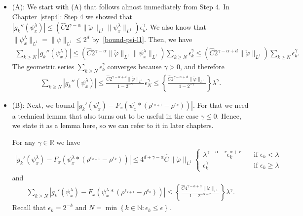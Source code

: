 \begin{itemize}
    \item (A): We start with (A) that follows almost immediately from Step 4. In Chapter~\ref{step4}: Step 4 we showed that \(|g_k''(\psi^{\lambda}_x)| 
    {\leq}  \left(\hat C  2^{\gamma - \alpha} \lVert \check \varphi \rVert_{L^1} \lVert \psi^{\lambda}_x \rVert_{L^1}\right) \epsilon_k^\gamma\). We also know that \(\lVert \psi^\lambda_x \rVert_{L^1} = \lVert \psi \rVert_{L^1} \leq 2^d\) by~\eqref{bound-psi-l1}. Then, we have
    \begin{align*}
        \sum_{k \geq N} |g_k''(\psi^{\lambda}_x)|  \leq 
        \left(\hat C  2^{\gamma - \alpha} \lVert \check \varphi \rVert_{L^1} \lVert \psi^{\lambda}_x \rVert_{L^1}\right) \sum_{k \geq N}  \epsilon_k^\gamma 
        \leq \left(\hat C  2^{\gamma - \alpha + d} \lVert \check \varphi \rVert_{L^1} \right) \sum_{k \geq N}  \epsilon_k^\gamma.
    \end{align*}
    The geometric series \(\sum\limits_{k \geq N}  \epsilon_k^\gamma\) converges because \(\gamma > 0\), and therefore
    \begin{align*}
        \sum_{k \geq N} |g_k''(\psi^{\lambda}_x)| \leq 
        \frac{\hat C  2^{\gamma - \alpha + d} \lVert \check \varphi \rVert_{L^1}}{1-2^{-\gamma}} \epsilon_N^{\gamma}
        \leq
        \left\{\frac{\hat C  2^{\gamma - \alpha + d} \lVert \check \varphi \rVert_{L^1}}{1-2^{-\gamma}}\right\} \lambda^{\gamma}.
    \end{align*}
 
    \item (B): Next, we bound \(|g_k'(\psi^\epsilon_x) - F_x(\psi^\epsilon_x * (\rho^{\epsilon_{k+1}} - \rho^{\epsilon_k}))|\). For that we need a technical lemma that also turns out to be useful in the case \(\gamma \leq 0\). Hence, we state it as a lemma here, so we can refer to it in later chapters.
    

    \begin{lemma}\label{technical-lemma-2}
        For any \(\gamma \in \mathbb{R}\) we have 
        \begin{align*}
            |g_k'(\psi^\lambda_x) - F_x(\psi^\lambda_x * (\rho^{\epsilon_{k+1}} - \rho^{\epsilon_k}))| \leq 4^{d + \gamma - \alpha} \hat C \lVert \check \varphi \rVert_{L^1} \begin{cases}
                \lambda^{\gamma - \alpha - r} \epsilon_k^{\alpha + r}  \quad &\text{if \(\epsilon_k < \lambda\) }\\
                \epsilon_k^\gamma & \text{if \(\epsilon_k \geq \lambda\) }
            \end{cases}
        \end{align*}
        and 
        \begin{align*}
            \sum_{k \geq N} |g_k'(\psi^\lambda_x) - F_x(\psi^\lambda_x * (\rho^{\epsilon_{k+1}} - \rho^{\epsilon_k}))|
            \leq
            \left \{ \frac{\hat C 4^{\gamma - \alpha + d} \lVert \check \varphi \rVert_{L^1} }{1-2^{-\alpha - r}} \right \} \lambda^{\gamma}.
        \end{align*}
        Recall that \(\epsilon_k = 2^{-k}\) and \(N = \min\left\{ k \in \mathbb{N}: \epsilon_k \leq \epsilon \right\}\).
    \end{lemma}


\end{itemize}
